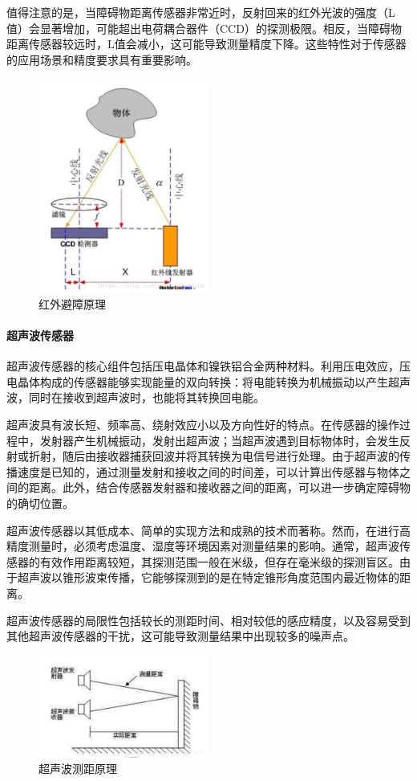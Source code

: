 \documentclass{report}
\begin{document}
值得注意的是，当障碍物距离传感器非常近时，反射回来的红外光波的强度（L值）会显著增加，可能超出电荷耦合器件（CCD）的探测极限。相反，当障碍物距离传感器较远时，L值会减小，这可能导致测量精度下降\cite{jh1}。这些特性对于传感器的应用场景和精度要求具有重要影响。


  \begin{figure}[ht]
    \centering
    \includegraphics[width=0.5\textwidth]{figures/hongwaibizhang.png}
    \caption{红外避障原理 }
  \end{figure}
\newpage
  \paragraph{超声波传感器}
超声波传感器的核心组件包括压电晶体和镍铁铝合金两种材料。利用压电效应，压电晶体构成的传感器能够实现能量的双向转换：将电能转换为机械振动以产生超声波，同时在接收到超声波时，也能将其转换回电能。

超声波具有波长短、频率高、绕射效应小以及方向性好的特点。在传感器的操作过程中，发射器产生机械振动，发射出超声波；当超声波遇到目标物体时，会发生反射或折射，随后由接收器捕获回波并将其转换为电信号进行处理。由于超声波的传播速度是已知的，通过测量发射和接收之间的时间差，可以计算出传感器与物体之间的距离。此外，结合传感器发射器和接收器之间的距离，可以进一步确定障碍物的确切位置。

超声波传感器以其低成本、简单的实现方法和成熟的技术而著称。然而，在进行高精度测量时，必须考虑温度、湿度等环境因素对测量结果的影响。通常，超声波传感器的有效作用距离较短，其探测范围一般在米级，但存在毫米级的探测盲区。由于超声波以锥形波束传播，它能够探测到的是在特定锥形角度范围内最近物体的距离。

超声波传感器的局限性包括较长的测距时间、相对较低的感应精度，以及容易受到其他超声波传感器的干扰，这可能导致测量结果中出现较多的噪声点。
\begin{figure}[ht]
    \centering
    \includegraphics[width=0.5\textwidth]{figures/super.png}
    \caption{超声波测距原理 }
  \end{figure}
\end{document}
